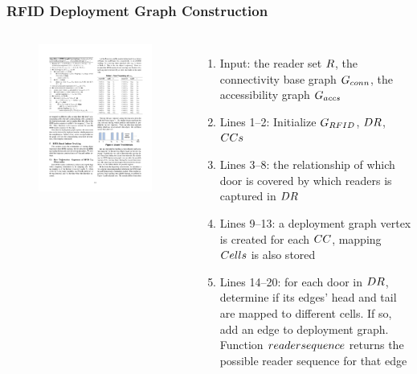 \begin{frame}
\frametitle{RFID Deployment Graph Construction}

\begin{columns}[c]

    \begin{figure}[tb]
      \includegraphics[width=\columnwidth]{figures/2-1-5.pdf}
    \end{figure}

  \scriptsize{
    \begin{enumerate}
      \item Input: \textrm{the reader set $\mathnormal{R}$, the connectivity base graph $\mathnormal{G_{conn}}$, the accessibility graph $\mathnormal{G_{accs}}$} \pause
      \item Lines 1--2: \textrm{Initialize $\mathnormal{G_{RFID}}$, $\mathnormal{DR}$, $\mathnormal{CCs}$} \pause
      \item Lines 3--8: \textrm{the relationship of which door is covered by which readers is captured in $\mathnormal{DR}$} \pause
      \item Lines 9--13: \textrm{a deployment graph vertex is created for each $\mathnormal{CC}$, mapping $\mathnormal{Cells}$ is also stored} \pause
      \item Lines 14--20: \textrm{for each door in $\mathnormal{DR}$, determine if its edges' head and tail are mapped to different cells. If so, add an edge to deployment graph. Function $\mathnormal{readersequence}$ returns the possible reader sequence for that edge}
    \end{enumerate}
  }
  \end{columns}


\end{frame}
